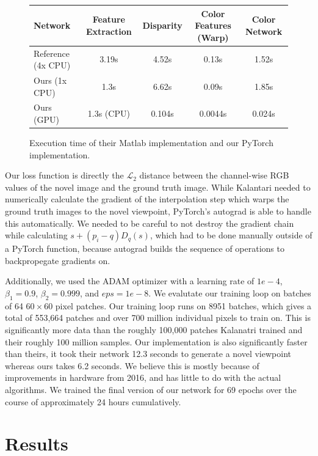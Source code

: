 \documentclass[10pt,twocolumn,letterpaper]{article}
\begin{document}
\begin{figure}
\begin{center}
\begin{tabular}{|l | c c c c|}
    \hline
    Network & Feature Extraction & Disparity & Color Features (Warp) & Color Network \\ \hline
    Reference (4x CPU) & 3.19s & 4.52s & 0.13s & 1.52s \\
    Ours (1x CPU) & 1.3s & 6.62s & 0.09s & 1.85s \\
    Ours (GPU) & 1.3s (CPU) & 0.104s & 0.0044s & 0.024s \\ \hline
\end{tabular}
\caption{Execution time of their Matlab implementation and our PyTorch implementation.}
\end{center}
\end{figure}

Our loss function is directly the $\mathcal{L}_2$ distance between the channel-wise RGB values of the novel image
and the ground truth image. While Kalantari \etal needed to numerically calculate the gradient of the interpolation
step which warps the ground truth images to the novel viewpoint, PyTorch's autograd is able to handle this automatically.
We needed to be careful to not destroy the gradient chain while calculating $s + \left(p_i - q\right) D_q(s)$, which had
to be done manually outside of a PyTorch function, because autograd builds the sequence of 
operations to backpropegate gradients on.

Additionally, we used the ADAM optimizer with a learning rate of $1e-4$, $\beta_1 = 0.9$, $\beta_2 = 0.999$, and $eps = 1e-8$.
We evalutate our training loop on batches of 64 $60 \times 60$ pixel patches. 
Our training loop runs on 8951 batches, which gives a total of 553,664 patches and over 700 million
individual pixels to train on. 
This is significantly more data than the roughly 100,000 patches Kalanatri \etal trained and their roughly 100 million samples.
Our implementation is also significantly faster than theirs, it took their network 12.3 seconds to generate a novel viewpoint
whereas ours takes 6.2 seconds. We believe this is mostly because of improvements in hardware from 2016, and has little to do with the
actual algorithms. We trained the final version of our network for 69 epochs over the course of approximately 24 hours cumulatively.

\section{Results}
\end{document}
